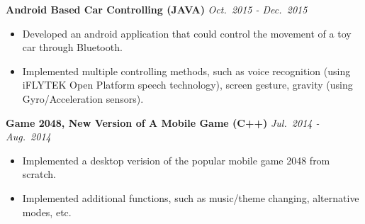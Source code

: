 \documentclass[10pt]{article}
\newenvironment{changemargin}[2]{%
  \begin{list}{}{%
    \setlength{\topsep}{0pt}%
    \setlength{\leftmargin}{#1}%
    \setlength{\rightmargin}{#2}%
    \setlength{\listparindent}{\parindent}%
    \setlength{\itemindent}{\parindent}%
    \setlength{\parsep}{\parskip}%
  }%
  \item[]}{\end{list}
}
\newenvironment{body} {
	\vspace*{-16pt}
	\begin{changemargin}{-0.65in}{-0.62in}
  }	
	{\end{changemargin}
}
\begin{document}
\begin{body}
\begin{itemize}
	\end{itemize}
	
	\vspace{-2pt}

	\textbf{Android Based Car Controlling (JAVA)} \hfill \emph{Oct.~2015 - Dec.~2015}
	\vspace*{-5pt}
	\begin{itemize} \itemsep -0pt		
		
	\item Developed an android application that could control the movement of a toy car through Bluetooth.
	\item Implemented multiple controlling methods, such as voice recognition (using iFLYTEK Open Platform speech technology), screen gesture, gravity (using Gyro/Acceleration sensors).		
	\end{itemize}
\vspace{-2pt}
	


	\textbf{Game 2048, New Version of A Mobile Game (C++)} \hfill \emph{Jul.~2014 - {Aug.}~2014}\\
	\vspace*{-5pt}
	\begin{itemize} \itemsep -0pt 
		\item Implemented a desktop verision of the popular mobile game 2048 from scratch.
		\item Implemented additional functions, such as music/theme changing, alternative modes, etc.
	\end{itemize} 
	

	
\end{body}
\end{document}
